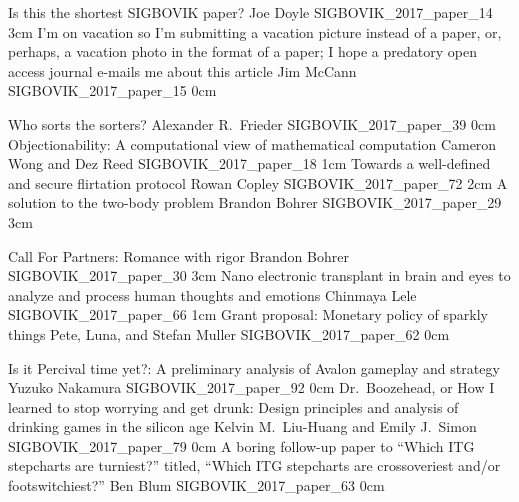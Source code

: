 

\addpaper
	{Is this the shortest SIGBOVIK paper?}
	{Joe Doyle}
	{}
	{SIGBOVIK_2017_paper_14}
	{3cm}
	{}
\addpaper
	{I'm on vacation so I'm submitting a vacation picture instead of a paper, or, perhaps, a vacation photo in the format of a paper; I hope a predatory open access journal e-mails me about this article}
	{Jim McCann}
	{}
	{SIGBOVIK_2017_paper_15}
	{0cm}
	{}

\addpaper
	{Who sorts the sorters?}
	{Alexander R.\ Frieder}
	{}
	{SIGBOVIK_2017_paper_39}
	{0cm}
	{}
\addpaper
	{Objectionability: A computational view of mathematical computation}
	{Cameron Wong and Dez Reed}
	{}
	{SIGBOVIK_2017_paper_18}
	{1cm}
	{}
\addpaper
	{Towards a well-defined and secure flirtation protocol}
	{Rowan Copley}
	{}
	{SIGBOVIK_2017_paper_72}
	{2cm}
	{}
\addpaper
	{A solution to the two-body problem}
	{Brandon Bohrer}
	{}
	{SIGBOVIK_2017_paper_29}
	{3cm}
	{}

\addpaper
	{Call For Partners: Romance with rigor}
	{Brandon Bohrer}
	{}
	{SIGBOVIK_2017_paper_30}
	{3cm}
	{}
\addpaper
	{Nano electronic transplant in brain and eyes to analyze and process human thoughts and emotions}
	{Chinmaya Lele}
	{}
	{SIGBOVIK_2017_paper_66}
	{1cm}
	{}
\addpaper
	{Grant proposal: Monetary policy of sparkly things}
	{Pete, Luna, and Stefan Muller}
	{}
	{SIGBOVIK_2017_paper_62}
	{0cm}
	{}

\addpaper
	{Is it Percival time yet?: A preliminary analysis of Avalon gameplay and strategy}
	{Yuzuko Nakamura}
	{}
	{SIGBOVIK_2017_paper_92}
	{0cm}
	{}
\addpaper
	{Dr.\ Boozehead, or How I learned to stop worrying and get drunk: Design principles and analysis of drinking games in the silicon age}
	{Kelvin M.\ Liu-Huang and Emily J.\ Simon}
	{}
	{SIGBOVIK_2017_paper_79}
	{0cm}
	{}
\addpaper
	{A boring follow-up paper to ``Which ITG stepcharts are turniest?'' titled, ``Which ITG stepcharts are crossoveriest and/or footswitchiest?''}
	{Ben Blum}
	{}
	{SIGBOVIK_2017_paper_63}
	{0cm}
	{}

